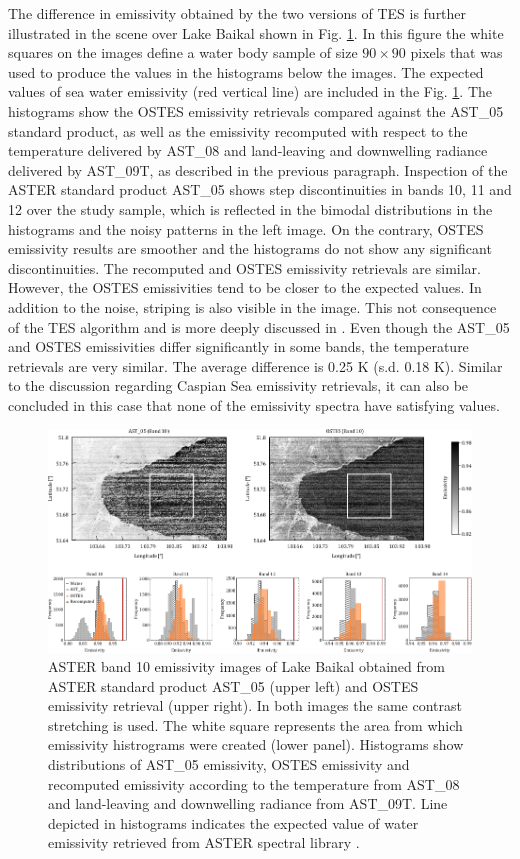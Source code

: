The difference in emissivity obtained by the two versions of TES is further illustrated in the scene over Lake Baikal shown in Fig. \ref{fig:Bajkal}. In this figure the white squares on the images define a water body sample of size $90 \times 90$ pixels that was used to produce the values in the histograms below the images. The expected values of sea water emissivity (red vertical line) are included in the Fig. \ref{fig:Bajkal}. The histograms show the OSTES emissivity retrievals compared against the AST\_05 standard product, as well as the emissivity recomputed with respect to the temperature delivered by AST\_08 and land-leaving and downwelling radiance delivered by AST\_09T, as described in the previous paragraph. Inspection of the ASTER standard product AST\_05 shows step discontinuities in bands 10, 11 and 12 over the study sample, which is reflected in the bimodal distributions in the histograms and the noisy patterns in the left image. On the contrary, OSTES emissivity results are smoother and the histograms do not show any significant discontinuities. The recomputed and OSTES emissivity retrievals are similar. However, the OSTES emissivities tend to be closer to the expected values. In addition to the noise, striping is also visible in the image. This not consequence of the TES algorithm and is more deeply discussed in \cite{gillespie_residual_2011}. Even though the AST\_05 and OSTES emissivities differ significantly in some bands, the temperature retrievals are very similar. The average difference is 0.25 K (s.d. 0.18 K). Similar to the discussion regarding Caspian Sea emissivity retrievals, it can also be concluded in this case that none of the emissivity spectra have satisfying values.

\begin{figure}[!t]
\centering
\includegraphics[width=7in]{pics/Chapter_03/pivov8}
\caption{
ASTER band 10 emissivity images of Lake Baikal obtained from ASTER standard product AST\_05 (upper left) and OSTES emissivity retrieval (upper right). In both images the same contrast stretching is used. The white square represents the area from which emissivity histrograms were created (lower panel). Histograms show distributions of AST\_05 emissivity, OSTES emissivity and recomputed emissivity according to the temperature from AST\_08 and land-leaving and downwelling radiance from AST\_09T. Line depicted in histograms indicates the expected value of water emissivity retrieved from ASTER spectral library \cite{baldridge_aster_2009}.}
\label{fig:Bajkal}
\end{figure}

